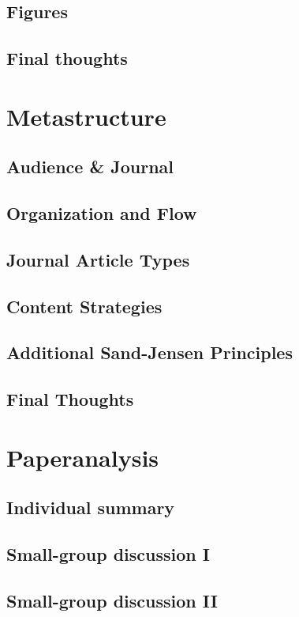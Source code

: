 \documentclass[12pt]{article}
\begin{document}
\subsection{Figures}
\subsection{Final thoughts}

\section{Metastructure}
\subsection{Audience \& Journal}
\subsection{Organization and Flow}
\subsection{Journal Article Types}
\subsection{Content Strategies}
\subsection{Additional Sand-Jensen Principles}
\subsection{Final Thoughts}

\section{Paperanalysis}
\subsection{Individual summary}
\subsection{Small-group discussion I}
\subsection{Small-group discussion II}
\end{document}
